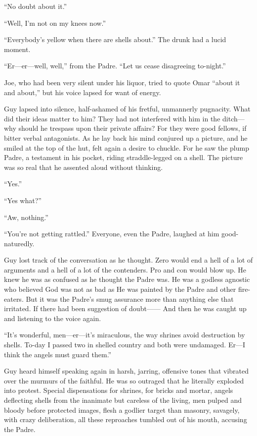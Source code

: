 ``No doubt about it.''

``Well, I'm not on my knees now.''

``Everybody's yellow when there are shells about.'' The drunk had a lucid moment.

``Er---er---well, well,'' from the Padre. ``Let us cease disagreeing to-night.''

Joe, who had been very silent under his liquor, tried to quote Omar ``about it and about,'' but his voice lapsed for want of energy.

Guy lapsed into silence, half-ashamed of his fretful, unmannerly pugnacity. What did their ideas matter to him? They had not interfered with him in the ditch---why should he trespass upon their private affairs? For they were good fellows, if bitter verbal antagonists. As he lay back his mind conjured up a picture, and he smiled at the top of the hut, felt again a desire to chuckle. For he saw the plump Padre, a testament in his pocket, riding straddle-legged on a shell. The picture was so real that he assented aloud without thinking.

``Yes.''

``Yes what?''

``Aw, nothing.''

``You're not getting rattled.'' Everyone, even the Padre, laughed at him good-naturedly.

Guy lost track of the conversation as he thought. Zero would end a hell of a lot of arguments and a hell of a lot of the contenders. Pro and con would blow up. He knew he was as confused as he thought the Padre was. He was a godless agnostic who believed God was not as bad as He was painted by the Padre and other fire-eaters. But it was the Padre's smug assurance more than anything else that irritated. If there had been suggestion of doubt------ And then he was caught up and listening to the voice again.

``It's wonderful, men---er---it's miraculous, the way shrines avoid destruction by shells. To-day I passed two in shelled country and both were undamaged. Er---I think the angels must guard them.''

Guy heard himself speaking again in harsh, jarring, offensive tones that vibrated over the murmurs of the faithful. He was so outraged that he literally exploded into protest. Special dispensations for shrines, for bricks and mortar, angels deflecting shells from the inanimate but careless of the living, men pulped and bloody before protected images, flesh a godlier target than masonry, savagely, with crazy deliberation, all these reproaches tumbled out of his mouth, accusing the Padre.

